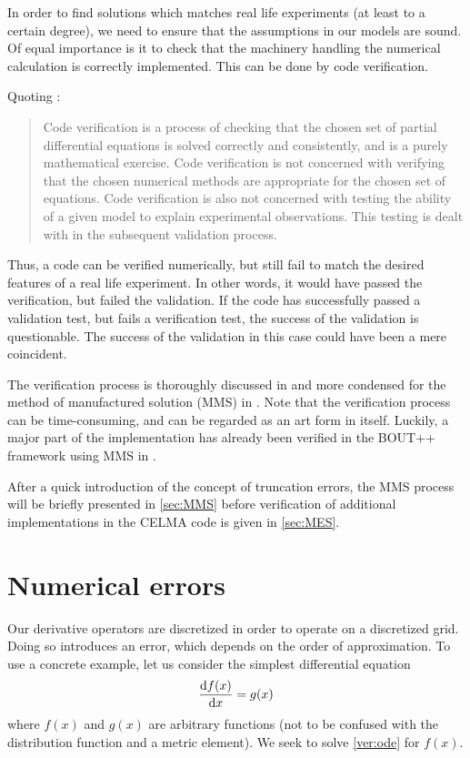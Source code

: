 In order to find solutions which matches real life experiments (at least to a certain degree), we need to ensure that the assumptions in our models are sound.
Of equal importance is it to check that the machinery handling the numerical calculation is correctly implemented.
This can be done by code verification.

Quoting \cite{Dudson2016}:

\blockquote{
Code verification is a process of checking that the chosen set of partial differential equations is solved correctly and consistently, and is a purely mathematical exercise.
Code verification is not concerned with verifying that the chosen numerical methods are appropriate for the chosen set of equations.
Code verification is also not concerned with testing the ability of a given model to explain experimental observations.
This testing is dealt with in the subsequent validation process.
}

Thus, a code can be verified numerically, but still fail to match the desired features of a real life experiment.
In other words, it would have passed the verification, but failed the validation.
If the code has successfully passed a validation test, but fails a verification test, the success of the validation is questionable.
The success of the validation in this case could have been a mere coincident.

The verification process is thoroughly discussed in \cite{Oberkampf2010book} and more condensed for the method of manufactured solution (MMS) in \cite{Salari}.
Note that the verification process can be time-consuming, and can be regarded as an art form in itself.
Luckily, a major part of the implementation has already been verified in the BOUT++ framework using MMS in \cite{Dudson2016}.

After a quick introduction of the concept of truncation errors, the MMS process will be briefly presented in \cref{sec:MMS} before verification of additional implementations in the CELMA code is given in \cref{sec:MES}.

\section{Numerical errors}
%
Our derivative operators are discretized in order to operate on a discretized grid.
Doing so introduces an error, which depends on the order of approximation.
To use a concrete example, let us consider the simplest differential equation
%
\begin{align}
    \frac{\text{d}{f(x)}}{\text{d}{x}} = g(x)
    \label{ver:ode}
\end{align}
%
where $f(x)$ and $g(x)$ are arbitrary functions (not to be confused with the distribution function and a metric element).
We seek to solve \cref{ver:ode} for $f(x)$.

